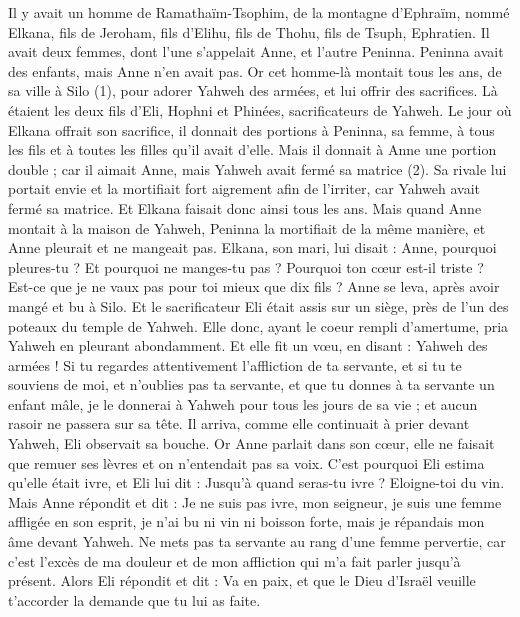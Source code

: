 \begin{multicols}{2}
\VerseOne{}Il y avait un homme de Ramathaïm-Tsophim, de la montagne d'Ephraïm, nommé Elkana, fils de Jeroham, fils d'Elihu, fils de Thohu, fils de Tsuph, Ephratien.
Il avait deux femmes, dont l'une s'appelait Anne, et l'autre Peninna. Peninna avait des enfants, mais Anne n'en avait pas.
Or cet homme-là montait tous les ans, de sa ville à Silo (1), pour adorer Yahweh des armées, et lui offrir des sacrifices. Là étaient les deux fils d’Eli, Hophni et Phinées, sacrificateurs de Yahweh.
Le jour où Elkana offrait son sacrifice, il donnait des portions à Peninna, sa femme, à tous les fils et à toutes les filles qu'il avait d'elle.
Mais il donnait à Anne une portion double ; car il aimait Anne, mais Yahweh avait fermé sa matrice (2).
Sa rivale lui portait envie et la mortifiait fort aigrement afin de l’irriter, car Yahweh avait fermé sa matrice.
Et Elkana faisait donc ainsi tous les ans. Mais quand Anne montait à la maison de Yahweh, Peninna la mortifiait de la même manière, et Anne pleurait et ne mangeait pas.
Elkana, son mari, lui disait : Anne, pourquoi pleures-tu ? Et pourquoi ne manges-tu pas ? Pourquoi ton cœur est-il triste ? Est-ce que je ne vaux pas pour toi mieux que dix fils ?
Anne se leva, après avoir mangé et bu à Silo. Et le sacrificateur Eli était assis sur un siège, près de l’un des poteaux du temple de Yahweh.
Elle donc, ayant le coeur rempli d'amertume, pria Yahweh en pleurant abondamment.
Et elle fit un vœu, en disant : Yahweh des armées ! Si tu regardes attentivement l'affliction de ta servante, et si tu te souviens de moi, et n'oublies pas ta servante, et que tu donnes à ta servante un enfant mâle, je le donnerai à Yahweh pour tous les jours de sa vie ; et aucun rasoir ne passera sur sa tête.
Il arriva, comme elle continuait à prier devant Yahweh, Eli observait sa bouche.
Or Anne parlait dans son cœur, elle ne faisait que remuer ses lèvres et on n'entendait pas sa voix. C’est pourquoi Eli estima qu'elle était ivre,
et Eli lui dit : Jusqu'à quand seras-tu ivre ? Eloigne-toi du vin.
Mais Anne répondit et dit : Je ne suis pas ivre, mon seigneur, je suis une femme affligée en son esprit, je n'ai bu ni vin ni boisson forte, mais je répandais mon âme devant Yahweh.
Ne mets pas ta servante au rang d'une femme pervertie, car c'est l’excès de ma douleur et de mon affliction qui m’a fait parler jusqu'à présent.
Alors Eli répondit et dit : Va en paix, et que le Dieu d'Israël veuille t’accorder la demande que tu lui as faite.

\end{multicols}
